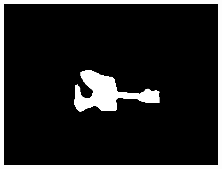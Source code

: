 \documentclass[12pt]{article}
\begin{document}
\begin{figure}[!h]
{\begin{minipage}[t]{0.15\linewidth}
  \includegraphics[width=1\linewidth]{90_gt.png}
  \end{minipage}%
  }%


\end{figure}
\end{document}
